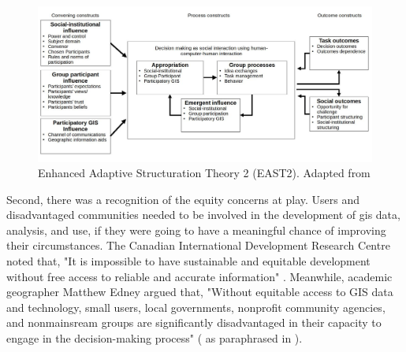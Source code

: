 \begin{figure}[h]
	\centering
	\includegraphics[scale=0.4]{Figures/chap2/east2.jpg}
	\caption[Enhanced Adaptive Structuration Theory 2 (EAST2)]{Enhanced Adaptive Structuration Theory 2 (EAST2). Adapted from \cite{jankowskiGISGroupDecision2001}}
	\label{fig:east2}
\end{figure}

Second, there was a recognition of the equity concerns at play. Users and disadvantaged communities needed to be involved in the development of \ac{gis} data, analysis, and use, if they were going to have a meaningful chance of improving their circumstances. The Canadian International Development Research Centre noted that, "It is impossible to have sustainable and equitable development without free access to reliable and accurate information" \cite{benmouffokInformationDecisionMaking1993}. Meanwhile, academic geographer Matthew Edney argued that, "Without equitable access to GIS data and technology, small users, local governments, nonprofit community agencies, and nonmainsream groups are significantly disadvantaged in their capacity to engage in the decision-making process" (\cite{edney1991strategies} as paraphrased in \cite{harrisPursuingSocialGoals1994}). 

